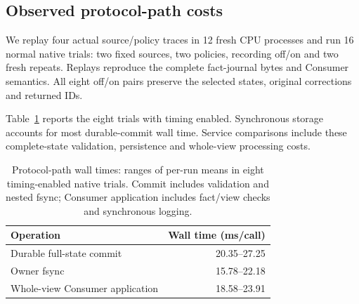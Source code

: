 \subsection{Observed protocol-path costs}
\label{subsec:protocol_cost}
We replay four actual source/policy traces in 12 fresh CPU processes and
run 16 normal native trials: two fixed sources, two policies, recording
off/on and two fresh repeats. Replays reproduce the complete fact-journal
bytes and Consumer semantics. All eight off/on pairs preserve the selected
states, original corrections and returned IDs.

Table~\ref{tab:protocol_cost} reports the eight trials with timing enabled.
Synchronous storage accounts for most durable-commit wall time. Service
comparisons include these complete-state validation, persistence and
whole-view processing costs.

\begin{table}[t]
\centering
\caption{Protocol-path wall times: ranges of per-run means in eight
timing-enabled native trials. Commit includes validation and nested fsync;
Consumer application includes fact/view checks and synchronous logging.}
\label{tab:protocol_cost}
\small\setlength{\tabcolsep}{4pt}
\begin{tabular}{@{}lr@{}}
\toprule
Operation & Wall time (ms/call)\\
\midrule
Durable full-state commit & 20.35--27.25\\
\quad Owner fsync & 15.78--22.18\\
Whole-view Consumer application & 18.58--23.91\\
\bottomrule
\end{tabular}
\end{table}
